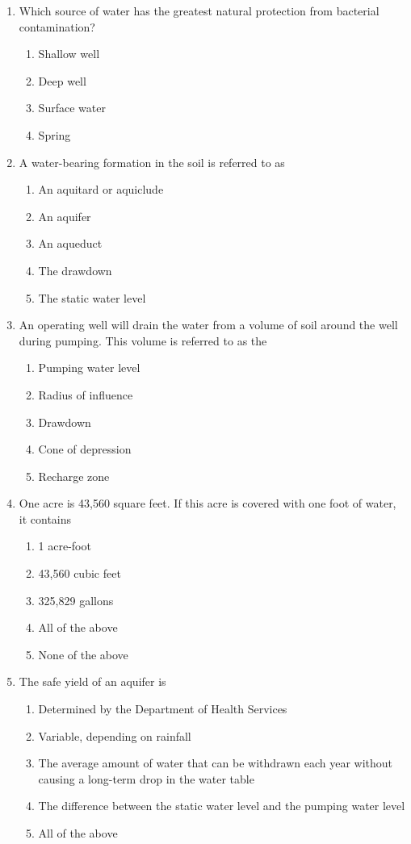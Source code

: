 \documentclass{article}
\begin{document}
\begin{enumerate}
\item Which source of water has the greatest natural protection from bacterial contamination?
\begin{enumerate}
\item Shallow well
\item Deep well
\item Surface water
\item Spring
\end{enumerate}

\item A water-bearing formation in the soil is referred to as
\begin{enumerate}
\item An aquitard or aquiclude
\item An aquifer
\item An aqueduct
\item The drawdown
\item The static water level
\end{enumerate}

\item An operating well will drain the water from a volume of soil around the well during pumping. This volume is referred to as the
\begin{enumerate}
\item Pumping water level
\item Radius of influence
\item Drawdown
\item Cone of depression
\item Recharge zone
\end{enumerate}

\item One acre is 43,560 square feet. If this acre is covered with one foot of water, it contains
\begin{enumerate}
\item 1 acre-foot
\item 43,560 cubic feet
\item 325,829 gallons
\item All of the above
\item None of the above
\end{enumerate}

\item The safe yield of an aquifer is
\begin{enumerate}
\item Determined by the Department of Health Services
\item Variable, depending on rainfall
\item The average amount of water that can be withdrawn each year without causing a long-term drop in the water table
\item The difference between the static water level and the pumping water level
\item All of the above
\end{enumerate}


\end{enumerate}
\end{document}
